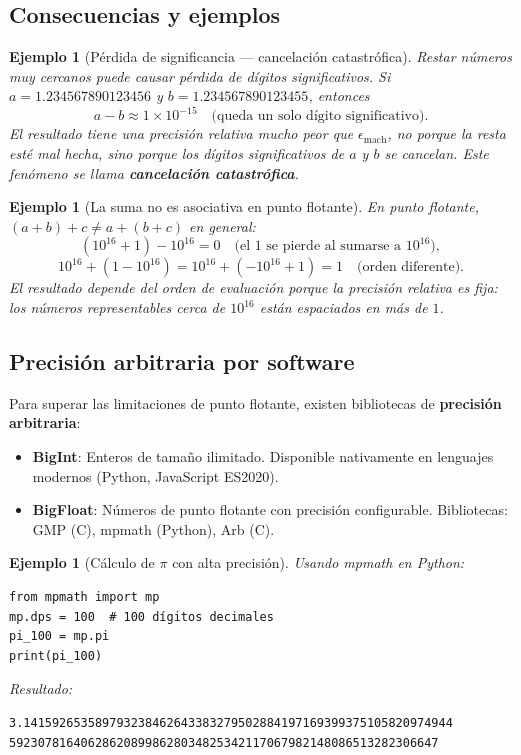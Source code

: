 \documentclass[a4paper,11pt]{report}
\newtheorem{example}[theorem]{Ejemplo}
\begin{document}
\subsection{Consecuencias y ejemplos}

\begin{example}[Pérdida de significancia --- cancelación catastrófica]\label{ex:cancelacion}
Restar números muy cercanos puede causar pérdida de dígitos significativos.  Si $a = 1.234567890123456$ y $b = 1.234567890123455$, entonces
\[
a - b \approx 1\times 10^{-15} \quad \text{(queda un solo dígito significativo)}.
\]
El resultado tiene una precisión relativa mucho peor que $\epsilon_{\text{mach}}$, no porque la resta esté mal hecha, sino porque los dígitos significativos de $a$ y $b$ se cancelan.  Este fenómeno se llama \textbf{cancelación catastrófica}.
\end{example}

\begin{example}[La suma no es asociativa en punto flotante]
En punto flotante, $(a + b) + c \neq a + (b + c)$ en general:
\[
(10^{16} + 1) - 10^{16} = 0 \quad \text{(el 1 se pierde al sumarse a $10^{16}$)},
\]
\[
10^{16} + (1 - 10^{16}) = 10^{16} + (-10^{16} + 1) = 1 \quad \text{(orden diferente)}.
\]
El resultado depende del orden de evaluación porque la precisión relativa es fija: los números representables cerca de $10^{16}$ están espaciados en más de $1$.
\end{example}

\subsection{Precisión arbitraria por software}

Para superar las limitaciones de punto flotante, existen bibliotecas de \textbf{precisión arbitraria}:

\begin{itemize}
\item \textbf{BigInt}: Enteros de tamaño ilimitado. Disponible nativamente en lenguajes modernos (Python, JavaScript ES2020).
\item \textbf{BigFloat}: Números de punto flotante con precisión configurable. Bibliotecas: GMP (C), mpmath (Python), Arb (C).
\end{itemize}

\begin{example}[Cálculo de $\pi$ con alta precisión]
Usando mpmath en Python:
\begin{verbatim}
from mpmath import mp
mp.dps = 100  # 100 dígitos decimales
pi_100 = mp.pi
print(pi_100)
\end{verbatim}
Resultado:
\begin{verbatim}
3.141592653589793238462643383279502884197169399375105820974944
592307816406286208998628034825342117067982148086513282306647
\end{verbatim}
\end{example}
\end{document}
